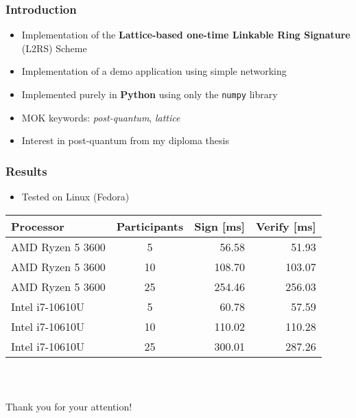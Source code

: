 \documentclass[%
  14pt,       				%
	t,                  %
	aspectratio=1610,   %
	unicode,						%
]{beamer}				    	%
\begin{document}
\disablenavigationsymbols

\maketitle


\begin{frame}[c]
	\frametitle{Introduction}
	\large{
		\begin{itemize}
			\item Implementation of the \textbf{Lattice-based one-time Linkable Ring Signature} (L2RS) Scheme
			\item Implementation of a demo application using simple networking
			\item Implemented purely in \textbf{Python} using only the \texttt{numpy} library
			\item MOK keywords: \textit{post-quantum}, \textit{lattice}
			\item Interest in post-quantum from my diploma thesis
		\end{itemize}
	}
\end{frame}

\begin{frame}[c]
	\frametitle{Results}
	\large{
		\begin{itemize}
			\item Tested on Linux (Fedora)
		\end{itemize}
	}
	\begin{table}[htbp]
		\centering
		\begin{tabular}{|l|c|r|r|}
			\hline
			Processor        & Participants & Sign [ms] & Verify [ms] \\
			\hline
			AMD Ryzen 5 3600 & 5            & 56.58     & 51.93       \\
			AMD Ryzen 5 3600 & 10           & 108.70    & 103.07      \\
			AMD Ryzen 5 3600 & 25           & 254.46    & 256.03      \\
			Intel i7-10610U  & 5            & 60.78     & 57.59       \\
			Intel i7-10610U  & 10           & 110.02    & 110.28      \\
			Intel i7-10610U  & 25           & 300.01    & 287.26      \\
			\hline
		\end{tabular}
	\end{table}
\end{frame}

\begin{frame}[c]
	\frametitle{\mbox{ }}
	\begin{center}
		{\Huge Thank you for your attention!}
	\end{center}
\end{frame}
\end{document}
